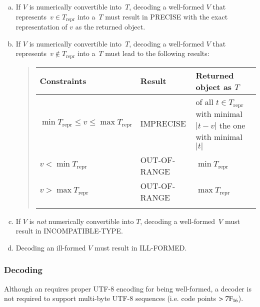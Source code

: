\begin{enumerate}[a)]
    \item
    If $V$ is numerically convertible into~$T$,
    decoding a well-formed $V$ that represents~$v \in T_{\text{repr}}$ into a~$T$ must result in PRECISE with
    the exact representation of $v$ as the returned object.

    \item
    If $V$ is numerically convertible into~$T$,
    decoding a well-formed $V$ that represents~$v \notin T_{\text{repr}}$ into a~$T$ must lead to the following results:
    \begin{quote}
        \newcommand{\addextrarowsep}{\addlinespace[0.7ex]}%
        \noindent
        \begin{tabular}{v{0.25\textwidth} l v{0.25\textwidth}}
            \toprule
            Constraints & Result & Returned object as $T$ \\
            \midrule
            $\min{T_{\text{repr}}} \le v \le \max{T_{\text{repr}}}$ &
                IMPRECISE &
                of all $t \in T_{\text{repr}}$ with minimal $|t - v|$ the one with minimal~$|t|$ \\ \addextrarowsep
            $v < \min{T_{\text{repr}}}$ &
                OUT-OF-RANGE & $\min{T_{\text{repr}}}$ \\ \addextrarowsep
            $v > \max{T_{\text{repr}}}$ &
                OUT-OF-RANGE & $\max{T_{\text{repr}}}$ \\ \addextrarowsep
            \bottomrule
        \end{tabular}
    \end{quote}

    \item
    If $V$ is \emph{not} numerically convertible into $T$, decoding a well-formed~$V$ must
    result in INCOMPATIBLE-TYPE.

    \item
    Decoding an ill-formed $V$ must result in ILL-FORMED.
\end{enumerate}


\subsubsection{Decoding \DborUtfEightStringValue}

Although an \DborUtfEightStringValue{} requires proper UTF-8 encoding for being well-formed,
a decoder is not required to support multi-byte UTF-8 sequences (i.e. code points $> \mathrm{7F}_{16}$).

